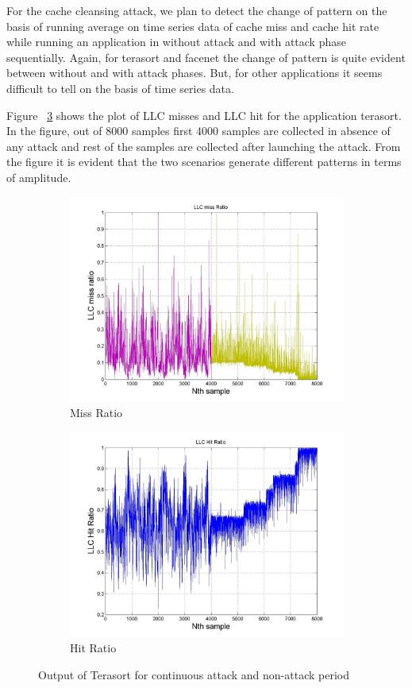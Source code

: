 \documentclass[a4paper,10pt]{article}
\begin{document}
For the cache cleansing attack, we plan to detect the change of pattern on the basis of running average on time series data of cache miss and cache hit rate while running an application in without attack and with attack phase sequentially. Again, for terasort and facenet the change of pattern is quite evident between  without and with attack phases. But, for other applications it seems difficult to tell on the basis of time series data. 

Figure ~\ref{fig:test} shows the plot of LLC misses and LLC hit for the application terasort. In the figure, out of 8000 samples first 4000 samples are collected in absence of any attack and rest of the samples are collected after launching the attack. From the figure it is evident that the two scenarios generate different patterns in terms of amplitude.  

\begin{figure}[htb]
\centering
\begin{subfigure}{.5\textwidth}
  \centering
  \includegraphics[width=.9\linewidth]{Figures/fig1.jpg}
  \caption{Miss Ratio}
  \label{fig:sub1}
\end{subfigure}%
\begin{subfigure}{.5\textwidth}
  \centering
  \includegraphics[width=.9\linewidth]{Figures/fig12.jpg}
  \caption{Hit Ratio}
  \label{fig:sub2}
\end{subfigure}
\caption{Output of Terasort for continuous attack and non-attack period}
\label{fig:test}
\end{figure}
\end{document}
